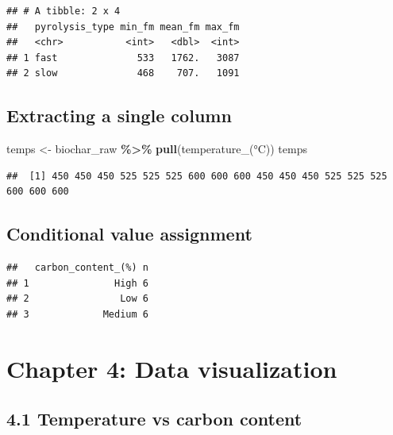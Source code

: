 \documentclass[
]{article}
\newenvironment{Shaded}{\begin{snugshade}}{\end{snugshade}}
\newcommand{\AttributeTok}[1]{\textcolor[rgb]{0.13,0.29,0.53}{#1}}
\newcommand{\FunctionTok}[1]{\textcolor[rgb]{0.13,0.29,0.53}{\textbf{#1}}}
\newcommand{\NormalTok}[1]{#1}
\newcommand{\OtherTok}[1]{\textcolor[rgb]{0.56,0.35,0.01}{#1}}
\newcommand{\SpecialCharTok}[1]{\textcolor[rgb]{0.81,0.36,0.00}{\textbf{#1}}}
\newcommand{\StringTok}[1]{\textcolor[rgb]{0.31,0.60,0.02}{#1}}
\begin{document}
\begin{verbatim}
## # A tibble: 2 x 4
##   pyrolysis_type min_fm mean_fm max_fm
##   <chr>           <int>   <dbl>  <int>
## 1 fast              533   1762.   3087
## 2 slow              468    707.   1091
\end{verbatim}

\subsection{Extracting a single
column}\label{extracting-a-single-column}

\begin{Shaded}
\begin{Highlighting}[]
\NormalTok{temps }\OtherTok{\textless{}{-}}\NormalTok{ biochar\_raw }\SpecialCharTok{\%\textgreater{}\%} \FunctionTok{pull}\NormalTok{(}\StringTok{\textasciigrave{}}\AttributeTok{temperature\_(°C)}\StringTok{\textasciigrave{}}\NormalTok{)}
\NormalTok{temps}
\end{Highlighting}
\end{Shaded}

\begin{verbatim}
##  [1] 450 450 450 525 525 525 600 600 600 450 450 450 525 525 525 600 600 600
\end{verbatim}

\subsection{Conditional value
assignment}\label{conditional-value-assignment}

\begin{verbatim}
##   carbon_content_(%) n
## 1               High 6
## 2                Low 6
## 3             Medium 6
\end{verbatim}

\section{Chapter 4: Data
visualization}\label{chapter-4-data-visualization}

\subsection{4.1 Temperature vs carbon
content}\label{temperature-vs-carbon-content}
\end{document}
